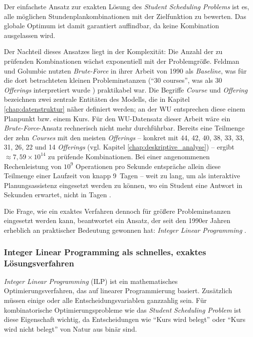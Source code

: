 Der einfachste Ansatz zur exakten Lösung des \textit{Student Scheduling Problems} ist es, alle möglichen Stundenplankombinationen mit der Zielfunktion zu bewerten. Das globale Optimum ist damit garantiert auffindbar, da keine Kombination ausgelassen wird.

Der Nachteil dieses Ansatzes liegt in der Komplexität: Die Anzahl der zu prüfenden Kombinationen wächst exponentiell mit der Problemgröße. Feldman und Golumbic nutzten \textit{Brute-Force} in ihrer Arbeit von 1990 als \textit{Baseline}, was für die dort betrachteten kleinen Probleminstanzen (\enquote{30 courses}, was als 30 \textit{Offerings} interpretiert wurde \cite{feldmangolumbic}) praktikabel war. Die Begriffe \textit{Course} und \textit{Offering} bezeichnen zwei zentrale Entitäten des Modells, die in Kapitel \ref{chap:datenstruktur} näher definiert werden; an der WU entsprechen diese einem Planpunkt bzw. einem Kurs. Für den WU-Datensatz dieser Arbeit wäre ein \textit{Brute-Force}-Ansatz rechnerisch nicht mehr durchführbar. Bereits eine Teilmenge der zehn \textit{Courses} mit den meisten \textit{Offerings} -- konkret mit 44, 42, 40, 38, 33, 33, 31, 26, 22 und 14 \textit{Offerings} (vgl. Kapitel \ref{chap:deskriptive_analyse}) -- ergibt $\approx 7{,}59 \times 10^{14}$ zu prüfende Kombinationen. Bei einer angenommenen Rechenleistung von $10^9$ Operationen pro Sekunde entspräche allein diese Teilmenge einer Laufzeit von knapp 9~Tagen -- weit zu lang, um als interaktive Planungsassistenz eingesetzt werden zu können, wo ein Student eine Antwort in Sekunden erwartet, nicht in Tagen \cite{nielsen-2024}.

Die Frage, wie ein exaktes Verfahren dennoch für größere Probleminstanzen eingesetzt werden kann, beantwortet ein Ansatz, der seit den 1990er Jahren erheblich an praktischer Bedeutung gewonnen hat: \textit{Integer Linear Programming} \cite{bixby2012brief,newman-2013}.



\newpage

\subsubsection{Integer Linear Programming als schnelles, exaktes Lösungsverfahren}\label{chap:ilp_als_loesung}

\textit{Integer Linear Programming} (ILP) ist ein mathematisches Optimierungsverfahren, das auf linearer Programmierung basiert. Zusätzlich müssen einige oder alle Entscheidungsvariablen ganzzahlig sein. Für kombinatorische Optimierungsprobleme wie das \textit{Student Scheduling Problem} ist diese Eigenschaft wichtig, da Entscheidungen wie \enquote{Kurs wird belegt} oder \enquote{Kurs wird nicht belegt} von Natur aus binär sind.

